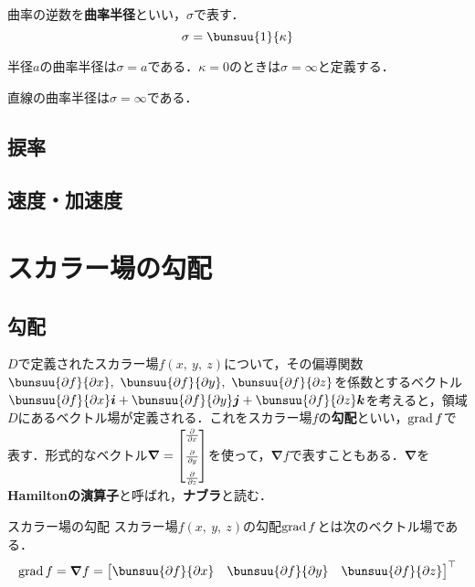 曲率の逆数を\textbf{曲率半径}といい，$\sigma$で表す．
\begin{equation}
	\sigma = \bunsuu{1}{\kappa}
\end{equation}

\begin{enumerate}[label=\textbf{[\arabic*]}, labelsep=10pt, leftmargin=23pt]
	\item 半径$a$の曲率半径は$\sigma = a$である．$\kappa = 0$のときは$\sigma = \infty$と定義する．
	\item 直線の曲率半径は$\sigma = \infty$である．
\end{enumerate}



\subsection{捩率}



\subsection{速度・加速度}


\section{スカラー場の勾配}
\subsection{勾配}

$D$で定義されたスカラー場$f(x,\ y,\ z)$について，その偏導関数$\bunsuu{\partial f}{\partial x},\ \bunsuu{\partial f}{\partial y},\ \bunsuu{\partial f}{\partial z}$を係数とするベクトル$\bunsuu{\partial f}{\partial x}\bm{i} + \bunsuu{\partial f}{\partial y}\bm{j} + \bunsuu{\partial f}{\partial z}\bm{k}$を考えると，領域$D$にあるベクトル場が定義される．これをスカラー場$f$の\textbf{勾配}といい，$\operatorname{grad} f$で表す．形式的なベクトル$\bm{\nabla} =
\begin{bmatrix}
	\scriptstyle\myfrac{\partial}{\partial x}\\[5pt]
	\scriptstyle\myfrac{\partial}{\partial y}\\[5pt]
	\scriptstyle\myfrac{\partial}{\partial z}
\end{bmatrix}
$を使って，$\bm{\nabla}f$で表すこともある．$\bm{\nabla}$を\textbf{Hamiltonの演算子}と呼ばれ，\textbf{ナブラ}と読む．

\begin{kousiki}{スカラー場の勾配}
	スカラー場$f(x,\ y,\ z)$の勾配$\operatorname{grad} f$とは次のベクトル場である．
	\begin{equation}
		\grad f = \bm{\nabla}f =
		{
		\begin{bmatrix}
			\bunsuu{\partial f}{\partial x} &
			\bunsuu{\partial f}{\partial y} &
			\bunsuu{\partial f}{\partial z}
		\end{bmatrix}
		}^\top
	\end{equation}
\end{kousiki}

